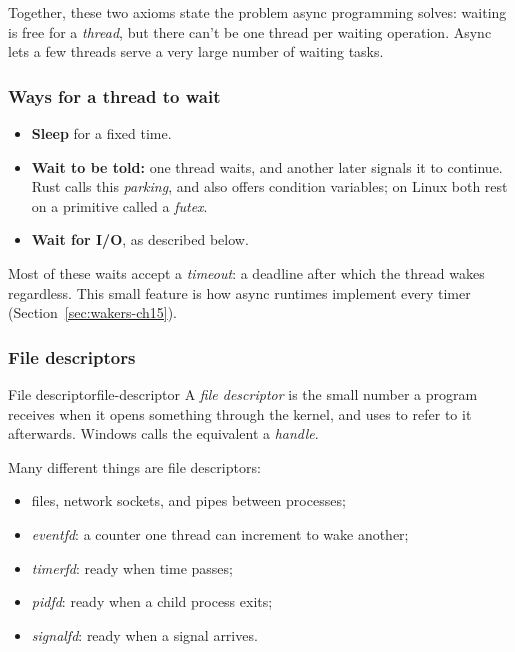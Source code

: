 Together, these two axioms state the problem async programming solves: waiting is free for a \emph{thread}, but there can't be one thread per waiting operation. Async lets a few threads serve a very large number of waiting tasks.

\subsubsection{Ways for a thread to wait}

\begin{itemize}
    \item \textbf{Sleep} for a fixed time.
    \item \textbf{Wait to be told:} one thread waits, and another later signals it to continue. Rust calls this \emph{parking}, and also offers condition variables; on Linux both rest on a primitive called a \emph{futex}.
    \item \textbf{Wait for I/O}, as described below.
\end{itemize}

Most of these waits accept a \emph{timeout}: a deadline after which the thread wakes regardless. This small feature is how async runtimes implement every timer (Section~\ref{sec:wakers-ch15}).

\subsubsection{File descriptors}

\begin{definition}{File descriptor}{file-descriptor}
    A \emph{file descriptor} is the small number a program receives when it opens something through the kernel, and uses to refer to it afterwards. Windows calls the equivalent a \emph{handle}.
\end{definition}

Many different things are file descriptors:

\begin{itemize}
    \item files, network sockets, and pipes between processes;
    \item \emph{eventfd}: a counter one thread can increment to wake another;
    \item \emph{timerfd}: ready when time passes;
    \item \emph{pidfd}: ready when a child process exits;
    \item \emph{signalfd}: ready when a signal arrives.
\end{itemize}


